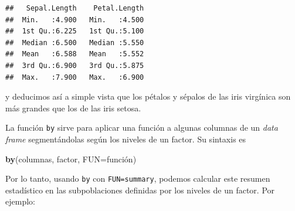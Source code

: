 \documentclass[]{book}
\newenvironment{Shaded}{\begin{snugshade}}{\end{snugshade}}
\newcommand{\DataTypeTok}[1]{\textcolor[rgb]{0.13,0.29,0.53}{#1}}
\newcommand{\DecValTok}[1]{\textcolor[rgb]{0.00,0.00,0.81}{#1}}
\newcommand{\KeywordTok}[1]{\textcolor[rgb]{0.13,0.29,0.53}{\textbf{#1}}}
\newcommand{\NormalTok}[1]{#1}
\newcommand{\OperatorTok}[1]{\textcolor[rgb]{0.81,0.36,0.00}{\textbf{#1}}}
\theoremstyle{definition}
\theoremstyle{definition}
\theoremstyle{definition}
\theoremstyle{remark}
\begin{document}
\begin{verbatim}
##   Sepal.Length    Petal.Length  
##  Min.   :4.900   Min.   :4.500  
##  1st Qu.:6.225   1st Qu.:5.100  
##  Median :6.500   Median :5.550  
##  Mean   :6.588   Mean   :5.552  
##  3rd Qu.:6.900   3rd Qu.:5.875  
##  Max.   :7.900   Max.   :6.900
\end{verbatim}

y deducimos así a simple vista que los pétalos y sépalos de las iris virgínica son más grandes que los de las iris setosa.

La función \texttt{by} sirve para aplicar una función a algunas columnas de un \emph{data frame} segmentándolas según los niveles de un factor. Su sintaxis es

\begin{Shaded}
\begin{Highlighting}[]
\KeywordTok{by}\NormalTok{(columnas, factor, }\DataTypeTok{FUN=}\NormalTok{función)}
\end{Highlighting}
\end{Shaded}

Por lo tanto, usando \texttt{by} con \texttt{FUN=summary}, podemos calcular este resumen estadístico en las subpoblaciones definidas por los niveles de un factor. Por ejemplo:

\begin{Shaded}
\end{Shaded}
\end{document}
